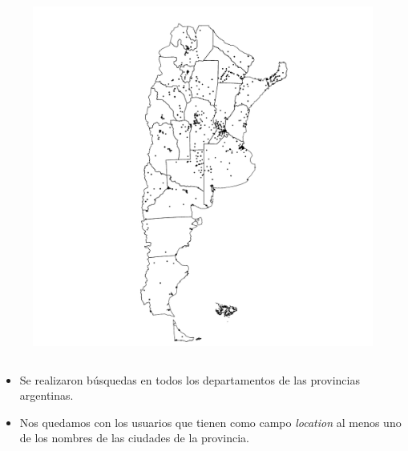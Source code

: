 \begin{frame}[t]
\begin{columns}
    \begin{column}{0.30\textwidth}
        \begin{figure}
            \includegraphics[width=\linewidth]{../src/images/mapaprovinciasConPuntos.pdf}
            \label{fig:mapaPuntos}
        \end{figure}
    \end{column}
\end{columns}

\begin{itemize}
    \item Se realizaron búsquedas en todos los departamentos de las provincias argentinas.
    \item Nos quedamos con los usuarios que tienen como campo \textit{location} al menos uno de los nombres de las ciudades de la provincia. 

\end{itemize}



\end{frame}

